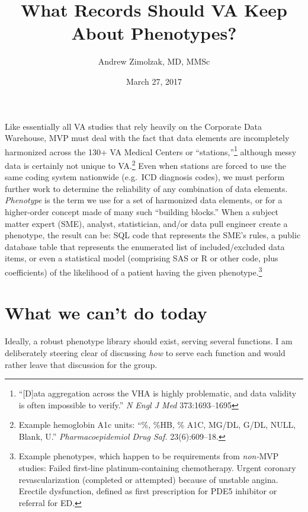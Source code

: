 \documentclass{tufte-handout}
\title{What Records Should VA Keep About Phenotypes?}
\author{Andrew Zimolzak, MD, MMSc}
\date{March 27, 2017}
\begin{document}
\maketitle

Like essentially all VA studies that rely heavily on the Corporate
Data Warehouse, MVP must deal with the fact that data elements are
incompletely harmonized across the 130+ VA Medical Centers or
``stations,''\footnote{``[D]ata aggregation across the VHA is highly
  problematic, and data validity is often impossible to verify.''
  \emph{N Engl J Med} 373:1693--1695} although messy data is certainly
not unique to VA.\footnote{Example hemoglobin A1c units: ``\%, \%HB,
  \% A1C, MG/DL, G/DL, NULL, Blank, U.'' \emph{Pharmacoepidemiol Drug
    Saf.} 23(6):609--18.} Even when stations are forced to use the
same coding system nationwide (e.g.\ ICD diagnosis codes), we must
perform further work to determine the reliability of any combination
of data elements. \emph{Phenotype} is the term we use for a set of
harmonized data elements, or for a higher-order concept made of many
such ``building blocks.'' When a subject matter expert (SME), analyst,
statistician, and/or data pull engineer create a phenotype, the result
can be: SQL code that represents the SME's rules, a public database
table that represents the enumerated list of included\slash excluded
data items, or even a statistical model (comprising SAS or R or other
code, plus coefficients) of the likelihood of a patient having the
given phenotype.\footnote{Example phenotypes, which happen to be
  requirements from \emph{non-}MVP studies: Failed first-line
  platinum-containing chemotherapy. Urgent coronary revascularization
  (completed or attempted) because of unstable angina. Erectile
  dysfunction, defined as first prescription for PDE5 inhibitor or
  referral for ED.}

\section{What we can't do today}

Ideally, a robust phenotype library should exist, serving several
functions. I am deliberately steering clear of discussing \emph{how}
to serve each function and would rather leave that discussion for the
group.
\end{document}
